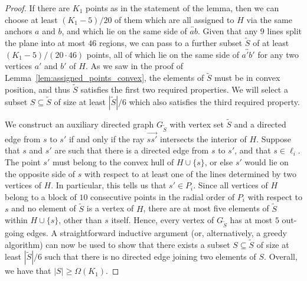 \documentclass[12pt,reqno, a4paper]{amsart}
\begin{document}
\begin{proof}
If there are $K_1$ points as in the statement of the lemma, then we can choose at least $(K_1-5)/20$ of them which are all assigned to $H$ via the same anchors $a$ and $b$, and which lie on the same side of $\overleftrightarrow{ab}$. Given that any $9$ lines split the plane into at most $46$ regions, we can pass to a further subset $\tilde S$ of at least $(K_1-5)/(20\cdot 46)$ points, all of which lie on the same side of $\overleftrightarrow{a'b'}$ for any two vertices $a'$ and $b'$ of $H$.  As we saw in the proof of Lemma~\ref{lem:assigned_points_convex}, the elements of $\tilde S$ must be in convex position, and thus $\tilde S$ satisfies the first two required properties. We will select a subset $S\subseteq\tilde S$ of size at least $|\tilde S|/6$ which also satisfies the third required property.

We construct an auxiliary directed graph $G_{\tilde S}$ with vertex set $\tilde S$ and a directed edge from $s$ to $s'$ if and only if the ray $\overrightarrow{ss'}$ intersects the interior of $H$. Suppose that $s$ and $s'$ are such that there is a directed edge from $s$ to $s'$, and that $s\in \ell_{i}$. The point $s'$ must belong to the convex hull of $H\cup\{s\}$, or else $s'$ would lie on the opposite side of $s$ with respect to at least one of the lines determined by two vertices of $H$. In particular, this tells us that $s'\in P_i$. Since all vertices of $H$ belong to a block of $10$ consecutive points in the radial order of $P_i$ with respect to $s$ and no element of $\tilde S$ is a vertex of $H$, there are at most five elements of $\tilde S$ within $H\cup\{s\}$, other than $s$ itself. Hence, every vertex of $G_{\tilde S}$ has at most $5$ out-going edges. A straightforward inductive argument (or, alternatively, a greedy algorithm) can now be used to show that there exists a subset $S\subseteq \tilde S$ of size at least $|\tilde S|/6$ such that there is no directed edge joining two elements of $S$. Overall, we have that $|S|\geq \Omega(K_1)$.


\end{proof}
\end{document}
